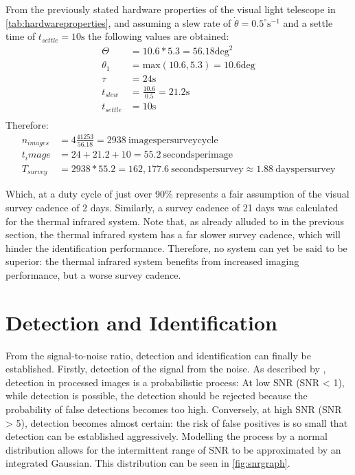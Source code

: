 From the previously stated hardware properties of the visual light telescope in \autoref{tab:hardwareproperties}, and assuming a slew rate of $\dot{\theta} = 0.5^\circ\mathrm{s}^{-1}$ and a settle time of $t_{settle} = 10 \mathrm{s}$ the following values are obtained:
\begin{align}
 \Theta &= 10.6 * 5.3 = 56.18\mathrm{deg}^2 \\
 \theta_1 &= \mathrm{max}(10.6, 5.3) = 10.6 \mathrm{deg} \\
 \tau &= 24 \mathrm{s} \\
 t_{slew} &= \frac{10.6}{0.5} = 21.2 \mathrm{s} \\
 t_{settle} &= 10 \mathrm{s} \\
\end{align}
Therefore:
\begin{align}
 n_{images} &= 4\frac{41253}{56.18} = 2938~\mathrm{images per survey cycle}\\
 t_image &= 24 + 21.2 + 10 = 55.2~\mathrm{seconds per image}\\
 T_{survey} &= 2938 * 55.2 = 162,177.6~\mathrm{seconds per survey} \approx 1.88~\mathrm{days per survey}
\end{align}

Which, at a duty cycle of just over 90\% represents a fair assumption of the visual survey cadence of 2 days. Similarly, a survey cadence of 21 days was calculated for the thermal infrared system. Note that, as already alluded to in the previous section, the thermal infrared system has a far slower survey cadence, which will hinder the identification performance. Therefore, no system can yet be said to be superior: the thermal infrared system benefits from increased imaging performance, but a worse survey cadence.

\section{Detection and Identification}
\label{sec:modelling_identification}

From the signal-to-noise ratio, detection and identification can finally be established. Firstly, detection of the signal from the noise. As described by \cite{2017NEOSDT}, detection in processed images is a probabilistic process: At low SNR (SNR < 1), while detection is possible, the detection should be rejected because the probability of false detections becomes too high. Conversely, at high SNR (SNR > 5), detection becomes almost certain: the risk of false positives is so small that detection can be established aggressively. Modelling the process by a normal distribution allows for the intermittent range of SNR to be approximated by an integrated Gaussian. This distribution can be seen in \autoref{fig:snrgraph}. \\

